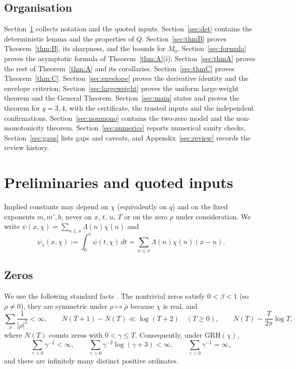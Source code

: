 \documentclass[11pt]{amsart}
\theoremstyle{definition}
\numberwithin{equation}{section}
\begin{document}
\subsection{Organisation}
Section~\ref{sec:prelim} collects notation and the quoted inputs.
Section~\ref{sec:det} contains the deterministic lemma and the
properties of $Q$. Section~\ref{sec:thmB} proves
Theorem~\ref{thm:B}, its sharpness, and the bounds for $M_0$.
Section~\ref{sec:formula} proves the asymptotic formula of
Theorem~\ref{thm:A}(i); Section~\ref{sec:thmA} proves the rest of
Theorem~\ref{thm:A} and its corollaries. Section~\ref{sec:thmC}
proves Theorem~\ref{thm:C}. Section~\ref{sec:envelope} proves the
derivative identity and the envelope criterion;
Section~\ref{sec:largeweight} proves the uniform large-weight theorem
and the General Theorem. Section~\ref{sec:main} states and proves the
theorem for $q=3,4$, with the certificate, the trusted inputs and the
independent confirmations. Section~\ref{sec:nonmono} contains the
two-zero model and the non-monotonicity theorem.
Section~\ref{sec:numerics} reports numerical sanity checks,
Section~\ref{sec:gaps} lists gaps and caveats, and
Appendix~\ref{sec:review} records the review history.

\section{Preliminaries and quoted inputs}\label{sec:prelim}

Implied constants may depend on $\chi$ (equivalently on $q$) and on
the fixed exponents $m,m',b$, never on $x$, $t$, $u$, $T$ or on the
zero $\rho$ under consideration. We write
$\psi(x,\chi)=\sum_{n\le x}\Lambda(n)\chi(n)$ and
\[
\psi_1(x,\chi):=\int_0^x\psi(t,\chi)\,dt
=\sum_{n\le x}\Lambda(n)\chi(n)(x-n) .
\]

\subsection{Zeros}\label{subsec:zeros}
We use the following standard facts \cite[\S\S12, 16]{Dav00}. The
nontrivial zeros satisfy $0<\beta<1$ (so $\rho\ne0$), they are
symmetric under $\rho\mapsto\bar\rho$ because $\chi$ is real, and
\begin{equation}\label{eq:zerosum}
\sum_\rho\frac{1}{|\rho|^2}<\infty,
\qquad
N(T+1)-N(T)\ll\log(T+2)\quad(T\ge0),
\qquad
N(T)\sim\frac{T}{2\pi}\log T ,
\end{equation}
where $N(T)$ counts zeros with $0<\gamma\le T$. Consequently, under
GRH$(\chi)$,
\begin{equation}\label{eq:gammasums}
\sum_{\gamma>0}\gamma^{-2}<\infty,\qquad
\sum_{\gamma>0}\gamma^{-2}\log(\gamma+3)<\infty,\qquad
\sum_{\gamma>0}\gamma^{-1}=\infty ,
\end{equation}
and there are infinitely many distinct positive ordinates.
\end{document}
